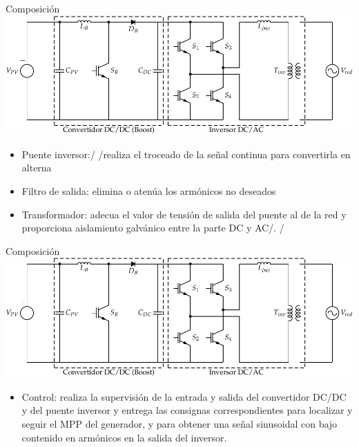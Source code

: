 \documentclass[xcolor={usenames,svgnames,dvipsnames}]{beamer}
\begin{document}
\begin{frame}[label=sec-2-0-10]{Composición}
\includegraphics[width=.9\linewidth]{../figs/InversorPV.pdf}

\begin{itemize}
\item \alert{Puente inversor}:/ /realiza el troceado de la señal continua para
convertirla en alterna

\item \alert{Filtro de salida}: elimina o atenúa los armónicos no deseados

\item \alert{Transformador}: adecua el valor de tensión de salida del puente al
de la red y proporciona aislamiento galvánico entre la parte DC y
AC/. /
\end{itemize}
\end{frame}

\begin{frame}[label=sec-2-0-11]{Composición}
\includegraphics[width=.9\linewidth]{../figs/InversorPV.pdf}

\begin{itemize}
\item \alert{Control}: realiza la supervisión de la entrada y salida del
convertidor DC/DC y del puente inversor y entrega las consignas
correspondientes para localizar y seguir el MPP del generador, y para
obtener una señal sinusoidal con bajo contenido en armónicos en la
salida del inversor.
\end{itemize}
\end{frame}
\end{document}
